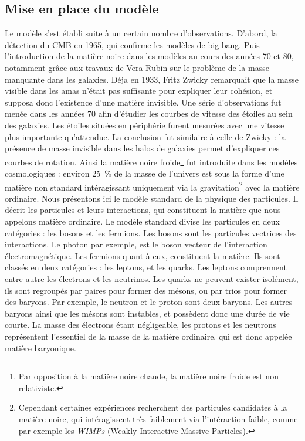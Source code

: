 \documentclass[11pt, twoside, a4paper, openright]{report}
\begin{document}
\subsection{Mise en place du modèle}
Le modèle s'est établi suite à un certain nombre d'observations. D'abord, la détection du CMB en 1965, qui confirme les modèles de big bang.
Puis l'introduction de la matière noire dans les modèles au cours des années 70 et 80, notamment grâce aux travaux de Vera Rubin sur le problème de la masse manquante dans les galaxies. Déja en 1933, Fritz Zwicky remarquait que la masse visible dans les amas n'était pas suffisante pour expliquer leur cohésion, et supposa donc l'existence d'une matière invisible. Une série d'observations fut menée dans les années 70 afin d'étudier les courbes de vitesse des étoiles au sein des galaxies. Les étoiles situées en périphérie furent mesurées avec une vitesse plus importante qu'attendue. La conclusion fut similaire à celle de Zwicky : la présence de masse invisible dans les halos de galaxies permet d'expliquer ces courbes de rotation. Ainsi la matière noire froide\footnote{Par opposition à la matière noire chaude, la matière noire froide est non relativiste.} fut introduite dans les modèles cosmologiques :
environ \SI{25}{\percent} de la masse de l'univers est sous la forme d'une matière non standard intéragissant uniquement via la gravitation\footnote{Cependant certaines expériences recherchent des particules candidates à la matière noire, qui intéragissent très faiblement via l'intéraction faible, comme par exemple les \emph{WIMPs} (Weakly Interactive Massive Particles).} avec la matière ordinaire.
Nous présentons ici le modèle standard de la physique des particules. Il décrit les particules et leurs interactions, qui constituent la matière que nous appelons matière ordinaire.
Le modèle standard divise les particules en deux catégories : les bosons et les fermions. Les bosons sont les particules vectrices des interactions. Le photon par exemple, est le boson vecteur de l'interaction électromagnétique. Les fermions quant à eux, constituent la matière. Ils sont classés en deux catégories : les leptons, et les quarks. Les leptons comprennent entre autre les électrons et les neutrinos. Les quarks ne peuvent exister isolément, ils sont regroupés par paires pour former des mésons, ou par trios pour former des baryons. Par exemple, le neutron et le proton sont deux baryons. Les autres baryons ainsi que les mésons sont instables, et possèdent donc une durée de vie courte.
La masse des électrons étant négligeable, les protons et les neutrons représentent l’essentiel de la masse de la matière ordinaire, qui est donc appelée matière baryonique.
\end{document}
